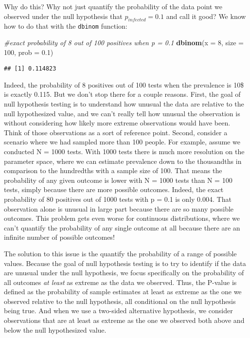 \documentclass[
]{book}
\newenvironment{Shaded}{\begin{snugshade}}{\end{snugshade}}
\newcommand{\AttributeTok}[1]{\textcolor[rgb]{0.13,0.29,0.53}{#1}}
\newcommand{\CommentTok}[1]{\textcolor[rgb]{0.56,0.35,0.01}{\textit{#1}}}
\newcommand{\DecValTok}[1]{\textcolor[rgb]{0.00,0.00,0.81}{#1}}
\newcommand{\FloatTok}[1]{\textcolor[rgb]{0.00,0.00,0.81}{#1}}
\newcommand{\FunctionTok}[1]{\textcolor[rgb]{0.13,0.29,0.53}{\textbf{#1}}}
\newcommand{\NormalTok}[1]{#1}
\begin{document}
Why do this? Why not just quantify the probability of the data point we observed under the null hypothesis that \(p_{infected} = 0.1\) and call it good? We know how to do that with the \texttt{dbinom} function:

\begin{Shaded}
\begin{Highlighting}[]
\CommentTok{\#exact probability of 8 out of 100 positives when p = 0.1}
\FunctionTok{dbinom}\NormalTok{(}\AttributeTok{x =} \DecValTok{8}\NormalTok{, }\AttributeTok{size =} \DecValTok{100}\NormalTok{, }\AttributeTok{prob =} \FloatTok{0.1}\NormalTok{)}
\end{Highlighting}
\end{Shaded}

\begin{verbatim}
## [1] 0.114823
\end{verbatim}

Indeed, the probability of 8 positives out of 100 tests when the prevalence is 10\$ is exactly 0.115. But we don't stop there for a couple reasons. First, the goal of null hypothesis testing is to understand how unusual the data are relative to the null hypothesized value, and we can't really tell how unusual the observation is without considering how likely more extreme observations would have been. Think of those observations as a sort of reference point. Second, consider a scenario where we had sampled more than 100 people. For example, assume we conducted N = 1000 tests. With 1000 tests there is much more resolution on the parameter space, where we can estimate prevalence down to the thousandths in comparison to the hundredths with a sample size of 100. That means the probability of any given outcome is lower with N = 1000 tests than N = 100 tests, simply because there are more possible outcomes. Indeed, the exact probability of 80 positives out of 1000 tests with p = 0.1 is only 0.004. That observation alone is unusual in large part because there are so many possible outcomes. This problem gets even worse for continuous distributions, where we can't quantify the probability of any single outcome at all because there are an infinite number of possible outcomes!

The solution to this issue is the quantify the probability of a range of possible values. Because the goal of null hypothesis testing is to try to identify if the data are unusual under the null hypothesis, we focus specifically on the probability of all outcomes \emph{at least} as extreme as the data we observed. Thus, the P-value is defined as the probability of sample estimates at least as extreme as the one we observed relative to the null hypothesis, all conditional on the null hypothesis being true. And when we use a two-sided alternative hypothesis, we consider observations that are at least as extreme as the one we observed both above and below the null hypothesized value.
\end{document}
